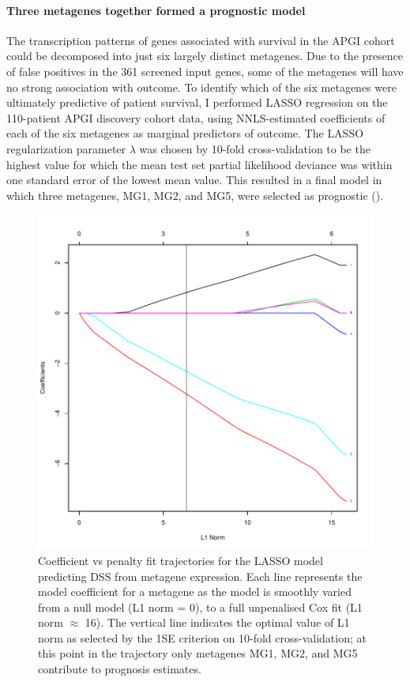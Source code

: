 \documentclass[dissertation.tex]{subfiles}
\begin{document}
\paragraph{Three metagenes together formed a prognostic model}
The transcription patterns of genes associated with survival in the \gls{APGI} cohort could be decomposed into just six largely distinct metagenes.  Due to the presence of false positives in the 361 screened input genes, some of the metagenes will have no strong association with outcome.  To identify which of the six metagenes were ultimately predictive of patient survival, I performed \gls{LASSO} regression on the 110-patient \gls{APGI} discovery cohort data, using \gls{NNLS}-estimated coefficients of each of the six metagenes as marginal predictors of outcome.  The \gls{LASSO} regularization parameter $\lambda$ was chosen by 10-fold cross-validation to be the highest value for which the mean test set partial likelihood deviance was within one standard error of the lowest mean value.  This resulted in a final model in which three metagenes, MG1, MG2, and MG5, were selected as prognostic ().

\begin{figure}
\centering
\includegraphics[width=.7\linewidth]{analysis/biosurv/reports/18_SIS_diag_dsd_final/figure/nmf-metagene-glmnet-plots-2}
\caption[Fit trajectory of the \gls{LASSO} predicting \acrshort{DSS} from metagene coefficients]{Coefficient vs penalty fit trajectories for the \acrshort{LASSO} model predicting \gls{DSS} from metagene expression.  Each line represents the model coefficient for a metagene as the model is smoothly varied from a null model (L1 norm = 0), to a full unpenalised Cox fit (L1 norm $\approx$ 16).  The vertical line indicates the optimal value of L1 norm as selected by the 1SE criterion on 10-fold cross-validation; at this point in the trajectory only metagenes MG1, MG2, and MG5 contribute to prognosis estimates.}\label{fig:sigs-resub-lasso-track}
\end{figure}
\end{document}
